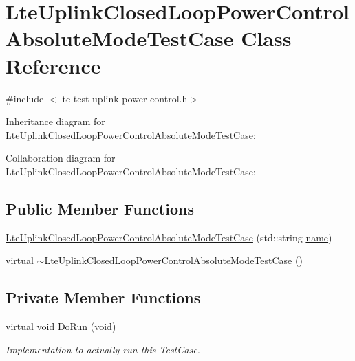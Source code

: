 \hypertarget{classLteUplinkClosedLoopPowerControlAbsoluteModeTestCase}{}\section{Lte\+Uplink\+Closed\+Loop\+Power\+Control\+Absolute\+Mode\+Test\+Case Class Reference}
\label{classLteUplinkClosedLoopPowerControlAbsoluteModeTestCase}


{\ttfamily \#include $<$lte-\/test-\/uplink-\/power-\/control.\+h$>$}



Inheritance diagram for Lte\+Uplink\+Closed\+Loop\+Power\+Control\+Absolute\+Mode\+Test\+Case\+:


Collaboration diagram for Lte\+Uplink\+Closed\+Loop\+Power\+Control\+Absolute\+Mode\+Test\+Case\+:
\subsection*{Public Member Functions}
\begin{DoxyCompactItemize}
\item 
\hyperlink{classLteUplinkClosedLoopPowerControlAbsoluteModeTestCase_ae40bad91bfc3b96d0e64fcf76e4de137}{Lte\+Uplink\+Closed\+Loop\+Power\+Control\+Absolute\+Mode\+Test\+Case} (std\+::string \hyperlink{generate__test__data__lte__spectrum__model_8m_ab74e6bf80237ddc4109968cedc58c151}{name})
\item 
virtual \hyperlink{classLteUplinkClosedLoopPowerControlAbsoluteModeTestCase_a55bafc08160caea97be00cb67a65eb53}{$\sim$\+Lte\+Uplink\+Closed\+Loop\+Power\+Control\+Absolute\+Mode\+Test\+Case} ()
\end{DoxyCompactItemize}
\subsection*{Private Member Functions}
\begin{DoxyCompactItemize}
\item 
virtual void \hyperlink{classLteUplinkClosedLoopPowerControlAbsoluteModeTestCase_a6a3e4107566655c5cbbf946c0e68c3d0}{Do\+Run} (void)
\begin{DoxyCompactList}\small\item\em Implementation to actually run this Test\+Case. \end{DoxyCompactList}\end{DoxyCompactItemize}
